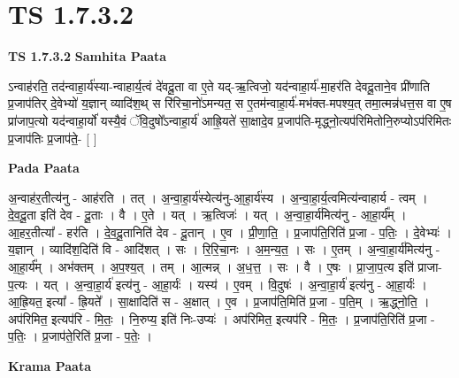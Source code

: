 \documentclass[17pt]{extarticle}
\begin{document}
\section*{ TS 1.7.3.2 }

\textbf{TS 1.7.3.2 } \newline
\textbf{Samhita Paata} \newline

ऽन्वाह॑रति॒ तद॑न्वाहा॒र्य॑स्या-न्वाहार्य॒त्वं दे॑वदू॒ता वा ए॒ते यद्-ऋ॒त्विजो॒ यद॑न्वाहा॒र्य॑-मा॒हर॑ति देवदू॒ताने॒व प्री॑णाति प्र॒जाप॑तिर् दे॒वेभ्यो॑ य॒ज्ञान् व्यादि॑श॒थ् स रि॑रिचा॒नो॑ऽमन्यत॒ स ए॒तम॑न्वाहा॒र्य॑-मभ॑क्त-मपश्य॒त् तमा॒त्मन्न॑धत्त॒स वा ए॒ष प्रा॑जाप॒त्यो यद॑न्वाहा॒र्यो॑ यस्यै॒वं ॅवि॒दुषो᳚ऽन्वाहा॒र्य॑ आह्रि॒यते॑ सा॒क्षादे॒व प्र॒जाप॑ति-मृद्ध्नो॒त्यप॑रिमितोनि॒रुप्योऽप॑रिमितः प्र॒जाप॑तिः प्र॒जाप॑ते॒- [ ] \newline

\textbf{Pada Paata} \newline

अ॒न्वाह॑र॒तीत्य॑नु - आह॑रति । तत् । अ॒न्वा॒हा॒र्य॑स्येत्य॑नु-आ॒हा॒र्य॑स्य । अ॒न्वा॒हा॒र्य॒त्वमित्य॑न्वाहार्य - त्वम् । दे॒व॒दू॒ता इति॑ देव - दू॒ताः । वै । ए॒ते । यत् । ऋ॒त्विजः॑ । यत् । अ॒न्वा॒हा॒र्य॑मित्य॑नु - आ॒हा॒र्य᳚म् । आ॒हर॒तीत्या᳚ - हर॑ति । दे॒व॒दू॒तानिति॑ देव - दू॒तान् । ए॒व । प्री॒णा॒ति॒ । प्र॒जाप॑ति॒रिति॑ प्र॒जा - प॒तिः॒ । दे॒वेभ्यः॑ । य॒ज्ञान् । व्यादि॑श॒दिति॑ वि - आदि॑शत् । सः । रि॒रि॒चा॒नः । अ॒म॒न्य॒त॒ । सः । ए॒तम् । अ॒न्वा॒हा॒र्य॑मित्य॑नु - आ॒हा॒र्य᳚म् । अभ॑क्तम् । अ॒प॒श्य॒त् । तम् । आ॒त्मन्न् । अ॒ध॒त्त॒ । सः । वै । ए॒षः । प्रा॒जा॒प॒त्य इति॑ प्राजा-प॒त्यः । यत् । अ॒न्वा॒हा॒र्य॑ इत्य॑नु - आ॒हा॒र्यः॑ । यस्य॑ । ए॒वम् । वि॒दुषः॑ । अ॒न्वा॒हा॒र्य॑ इत्य॑नु - आ॒हा॒र्यः॑ । आ॒ह्रि॒यत॒ इत्या᳚ - ह्रि॒यते᳚ । सा॒क्षादिति॑ स - अ॒क्षात् । ए॒व । प्र॒जाप॑ति॒मिति॑ प्र॒जा - प॒ति॒म् । ऋ॒द्ध्नो॒ति॒ । अप॑रिमित॒ इत्यप॑रि - मि॒तः॒ । नि॒रुप्य॒ इति॑ निः-उप्यः॑ । अप॑रिमित॒ इत्यप॑रि - मि॒तः॒ । प्र॒जाप॑ति॒रिति॑ प्र॒जा - प॒तिः॒ । प्र॒जाप॑ते॒रिति॑ प्र॒जा - प॒तेः॒ ।  \newline


\textbf{Krama Paata} \newline
\end{document}
